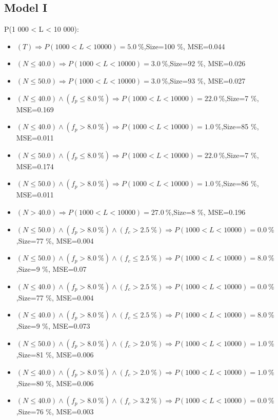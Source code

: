 \documentclass[numbered]{CSL}
\begin{document}
\subsection{Model I}
P(1 000 < L < 10 000):
\begin{itemize}
\item $(T) \Rightarrow P(1 000 < L < 10 000) = 5.0~\%$,\hfill Size=100 \%, MSE=0.044
\item $(N \leq 40.0) \Rightarrow P(1 000 < L < 10 000) = 3.0~\%$,\hfill Size=92 \%, MSE=0.026
\item $(N \leq 50.0) \Rightarrow P(1 000 < L < 10 000) = 3.0~\%$,\hfill Size=93 \%, MSE=0.027
\item $(N \leq 40.0) \land (f_p \leq 8.0~\%) \Rightarrow P(1 000 < L < 10 000) = 22.0~\%$,\hfill Size=7 \%, MSE=0.169
\item $(N \leq 40.0) \land (f_p > 8.0~\%) \Rightarrow P(1 000 < L < 10 000) = 1.0~\%$,\hfill Size=85 \%, MSE=0.011
\item $(N \leq 50.0) \land (f_p \leq 8.0~\%) \Rightarrow P(1 000 < L < 10 000) = 22.0~\%$,\hfill Size=7 \%, MSE=0.174
\item $(N \leq 50.0) \land (f_p > 8.0~\%) \Rightarrow P(1 000 < L < 10 000) = 1.0~\%$,\hfill Size=86 \%, MSE=0.011
\item $(N > 40.0) \Rightarrow P(1 000 < L < 10 000) = 27.0~\%$,\hfill Size=8 \%, MSE=0.196
\item $(N \leq 50.0) \land (f_p > 8.0~\%) \land (f_c > 2.5~\%) \Rightarrow P(1 000 < L < 10 000) = 0.0~\%$,\hfill Size=77 \%, MSE=0.004
\item $(N \leq 50.0) \land (f_p > 8.0~\%) \land (f_c \leq 2.5~\%) \Rightarrow P(1 000 < L < 10 000) = 8.0~\%$,\hfill Size=9 \%, MSE=0.07
\item $(N \leq 40.0) \land (f_p > 8.0~\%) \land (f_c > 2.5~\%) \Rightarrow P(1 000 < L < 10 000) = 0.0~\%$,\hfill Size=77 \%, MSE=0.004
\item $(N \leq 40.0) \land (f_p > 8.0~\%) \land (f_c \leq 2.5~\%) \Rightarrow P(1 000 < L < 10 000) = 8.0~\%$,\hfill Size=9 \%, MSE=0.073
\item $(N \leq 50.0) \land (f_p > 8.0~\%) \land (f_c > 2.0~\%) \Rightarrow P(1 000 < L < 10 000) = 1.0~\%$,\hfill Size=81 \%, MSE=0.006
\item $(N \leq 40.0) \land (f_p > 8.0~\%) \land (f_c > 2.0~\%) \Rightarrow P(1 000 < L < 10 000) = 1.0~\%$,\hfill Size=80 \%, MSE=0.006
\item $(N \leq 40.0) \land (f_p > 8.0~\%) \land (f_c > 3.2~\%) \Rightarrow P(1 000 < L < 10 000) = 0.0~\%$,\hfill Size=76 \%, MSE=0.003

\end{itemize}
\end{document}
